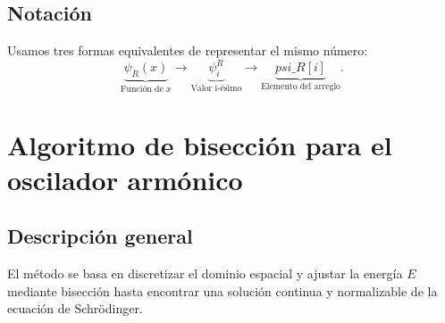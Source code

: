 \documentclass[11pt]{article}
\begin{document}
\subsection{Notación}
Usamos tres formas equivalentes de representar el mismo número:
\[
\underbrace{\psi_R(x)}_{\text{Función de }x}
\to
\underbrace{\psi_i^R}_{\text{Valor i-ésimo}}
\to
\underbrace{psi\_R[i]}_{\text{Elemento del arreglo}}.
\]

\section{Algoritmo de bisección para el oscilador armónico}
\label{sec:ho-bisection}

\subsection{Descripción general}
El método se basa en discretizar el dominio espacial y ajustar la energía \(E\)
mediante bisección hasta encontrar una solución continua y normalizable de la ecuación de Schrödinger.
\end{document}
